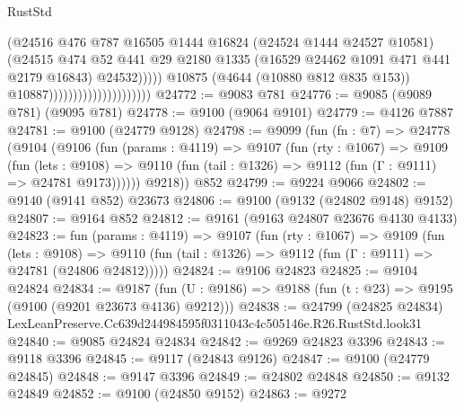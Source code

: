 \begin{lexlean}{RustStd}
\begin{coremodule}
                                                    (@24516
                                                      @476
                                                      @787
                                                      @16505
                                                      @1444
                                                      @16824
                                                      (@24524 @1444 @24527 @10581)
                                                      (@24515
                                                        @474
                                                        @52
                                                        @441
                                                        @29
                                                        @2180
                                                        @1335
                                                        (@16529 @24462 @1091 @471 @441 @2179 @16843)
                                                        @24532)))))
                                              @10875
                                              (@4644 (@10880 @812 @835 @153))
                                              @10887)))))))))))))))))))))
@24772 := @9083 @781
@24776 := @9085 (@9089 @781) (@9095 @781)
@24778 := @9100 (@9064 @9101)
@24779 := @4126 @7887
@24781 := @9100 (@24779 @9128)
@24798 := @9099
    (fun (fn : @7) =>
    @24778
      (@9104
        (@9106
          (fun (params : @4119) =>
          @9107
            (fun (rty : @1067) =>
            @9109
              (fun (lets : @9108) =>
              @9110 (fun (tail : @1326) => @9112 (fun (Γ : @9111) => @24781 @9173))))))
        @9218))
    @852
@24799 := @9224 @9066
@24802 := @9140 (@9141 @852) @23673
@24806 := @9100 (@9132 (@24802 @9148) @9152)
@24807 := @9164 @852
@24812 := @9161 (@9163 @24807 @23676 @4130 @4133)
@24823 := fun (params : @4119) =>
  @9107
    (fun (rty : @1067) =>
    @9109
      (fun (lets : @9108) =>
      @9110 (fun (tail : @1326) => @9112 (fun (Γ : @9111) => @24781 (@24806 @24812)))))
@24824 := @9106 @24823
@24825 := @9104 @24824
@24834 := @9187
    (fun (U : @9186) => @9188 (fun (t : @23) => @9195 (@9100 (@9201 @23673 @4136) @9212)))
@24838 := @24799
    (@24825 @24834)
    LexLeanPreserve.Cc639d244984595f0311043c4c505146e.R26.RustStd.look31
@24840 := @9085 @24824 @24834
@24842 := @9269 @24823 @3396
@24843 := @9118 @3396
@24845 := @9117 (@24843 @9126)
@24847 := @9100 (@24779 @24845)
@24848 := @9147 @3396
@24849 := @24802 @24848
@24850 := @9132 @24849
@24852 := @9100 (@24850 @9152)
@24863 := @9272

\end{coremodule}
\end{lexlean}
